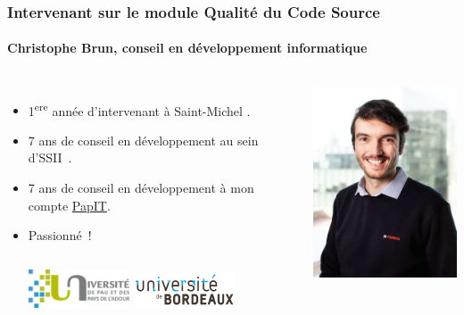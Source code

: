 \documentclass{beamer}
\begin{document}
    \begin{frame}
        \transdissolve
        \frametitle{Intervenant sur le module Qualité du Code Source}
        \framesubtitle{Christophe Brun, conseil en développement informatique}

        \begin{columns}
            \begin{itemize}
                \item 1\textsuperscript{ere} année d'intervenant à Saint-Michel .

                \item 7 ans de conseil en développement au sein d'SSII~.

                \item 7 ans de conseil en développement à mon compte \href{https://papit.fr}{PapIT}.

                \item Passionné~!
                \bigbreak
                \begin{columns}
                    \centering
                    \includegraphics[width=3cm]{image/logo-uppa.png}
                    \centering
                    \includegraphics[width=3cm]{image/logo-universite-bordeaux.png}
                \end{columns}
            \end{itemize}
            \centering
            \includegraphics[width=5cm]{image/trombine-christophe.jpg}
        \end{columns}
    \end{frame}
\end{document}
